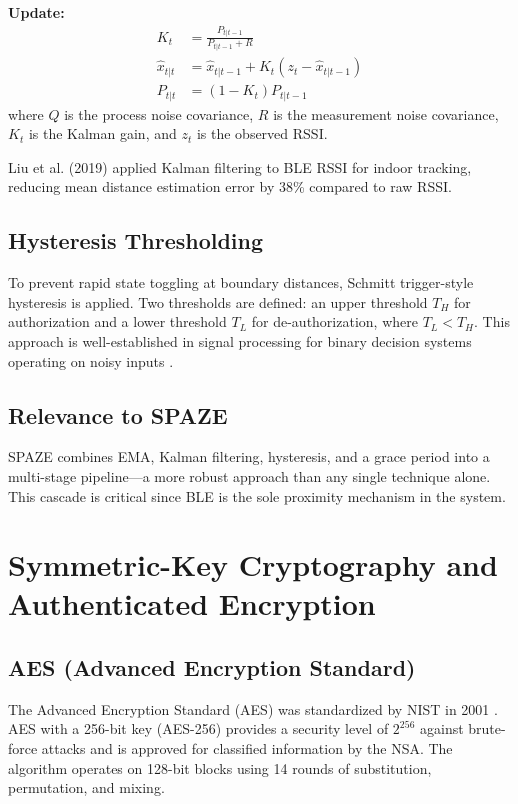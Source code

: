 \documentclass[conference]{IEEEtran}
\begin{document}
\textbf{Update:}
\begin{align}
    K_t &= \frac{P_{t|t-1}}{P_{t|t-1} + R} \label{eq:kalman_gain} \\
    \hat{x}_{t|t} &= \hat{x}_{t|t-1} + K_t(z_t - \hat{x}_{t|t-1}) \label{eq:kalman_update} \\
    P_{t|t} &= (1 - K_t) P_{t|t-1} \label{eq:kalman_post}
\end{align}
where $Q$ is the process noise covariance, $R$ is the measurement noise covariance, $K_t$ is the Kalman gain, and $z_t$ is the observed RSSI.

Liu et al. (2019) \cite{liu2019kalman} applied Kalman filtering to BLE RSSI for indoor tracking, reducing mean distance estimation error by 38\% compared to raw RSSI.

\subsection{Hysteresis Thresholding}
To prevent rapid state toggling at boundary distances, Schmitt trigger-style hysteresis is applied. Two thresholds are defined: an upper threshold $T_H$ for authorization and a lower threshold $T_L$ for de-authorization, where $T_L < T_H$. This approach is well-established in signal processing for binary decision systems operating on noisy inputs \cite{sedra2014}.

\subsection{Relevance to SPAZE}
SPAZE combines EMA, Kalman filtering, hysteresis, and a grace period into a multi-stage pipeline—a more robust approach than any single technique alone. This cascade is critical since BLE is the sole proximity mechanism in the system.

\section{Symmetric-Key Cryptography and Authenticated Encryption}
\label{sec:crypto}

\subsection{AES (Advanced Encryption Standard)}
The Advanced Encryption Standard (AES) was standardized by NIST in 2001 \cite{aes_nist}. AES with a 256-bit key (AES-256) provides a security level of $2^{256}$ against brute-force attacks and is approved for classified information by the NSA. The algorithm operates on 128-bit blocks using 14 rounds of substitution, permutation, and mixing.
\end{document}

